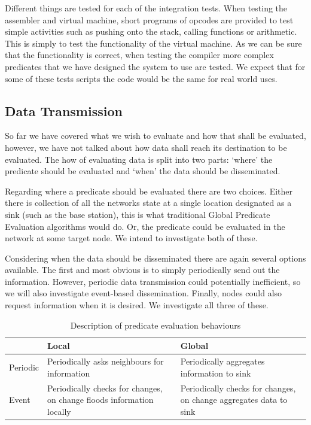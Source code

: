 Different things are tested for each of the integration tests. When testing the assembler and virtual machine, short programs of opcodes are provided to test simple activities such as pushing onto the stack, calling functions or arithmetic. This is simply to test the functionality of the virtual machine. As we can be sure that the functionality is correct, when testing the compiler more complex predicates that we have designed the system to use are tested. We expect that for some of these tests scripts the code would be the same for real world uses.



\subsection{Data Transmission}

So far we have covered what we wish to evaluate and how that shall be evaluated, however, we have not talked about how data shall reach its destination to be evaluated. The how of evaluating data is split into two parts: `where' the predicate should be evaluated and `when' the data should be disseminated.

Regarding where a predicate should be evaluated there are two choices. Either there is collection of all the networks state at a single location designated as a sink (such as the base station), this is what traditional Global Predicate Evaluation algorithms would do. Or, the predicate could be evaluated in the network at some target node. We intend to investigate both of these.

Considering when the data should be disseminated there are again several options available. The first and most obvious is to simply periodically send out the information. However, periodic data transmission could potentially inefficient, so we will also investigate event-based dissemination. Finally, nodes could also request information when it is desired. We investigate all three of these.

\begin{table}[H]
\centering
\begin{tabular}{| l | m{5cm} | m{5cm} |}
\hline
~ & Local & Global \\
\hline
Periodic & Periodically asks neighbours for information & Periodically aggregates information to sink \\
\hline
Event & Periodically checks for changes, on change floods information locally &  Periodically checks for changes, on change aggregates data to sink \\
\hline
\end{tabular}
\caption{Description of predicate evaluation behaviours}
\end{table}


